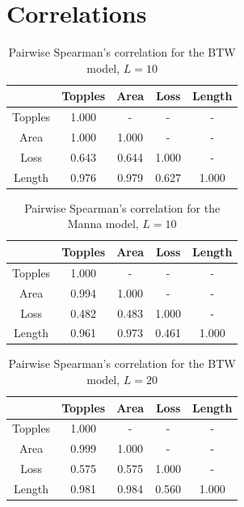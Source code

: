 \chapter{Correlations}\label{app:correlations}

\begin{table}[htbp]
    \centering
    \begin{tabular}{ccccc}\toprule
         &  Topples&  Area&  Loss& Length\\\midrule
         Topples&  1.000&  -&  -& -\\
         Area&  1.000&  1.000&  -& -\\
         Loss&  0.643&  0.644&  1.000& -\\
         Length&  0.976&  0.979&  0.627& 1.000\\ \bottomrule
    \end{tabular}
    \caption{Pairwise Spearman's correlation for the BTW model, $L=10$}
    \label{tab:corrBTW10}
\end{table}

\begin{table}[htbp]
    \centering
    \begin{tabular}{ccccc}\toprule
         &  Topples&  Area&  Loss& Length\\\midrule
         Topples&  1.000&  -&  -& -\\
         Area&  0.994&  1.000&  -& -\\
         Loss&  0.482&  0.483&  1.000& -\\
         Length&  0.961&  0.973&  0.461& 1.000\\ \bottomrule
    \end{tabular}
    \caption{Pairwise Spearman's correlation for the Manna model, $L=10$}
    \label{tab:corrManna10}
\end{table}

\begin{table}[htbp]
    \centering
    \begin{tabular}{ccccc}\toprule
         &  Topples&  Area&  Loss& Length\\\midrule
         Topples&  1.000&  -&  -& -\\
         Area&  0.999&  1.000&  -& -\\
         Loss&  0.575&  0.575&  1.000& -\\
         Length&  0.981&  0.984&  0.560& 1.000\\ \bottomrule
    \end{tabular}
    \caption{Pairwise Spearman's correlation for the BTW model, $L=20$}
    \label{tab:corrBTW20}
\end{table}

